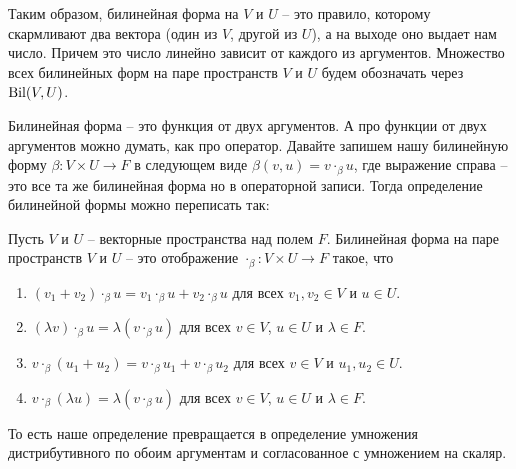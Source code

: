 Таким образом, билинейная форма на $V$ и $U$ -- это правило, которому скармливают два вектора (один из $V$, другой из $U$), а на выходе оно выдает нам число.
Причем это число линейно зависит от каждого из аргументов.
Множество всех билинейных форм на паре пространств $V$ и $U$ будем обозначать через $\operatorname{Bil}(V,U)$.

Билинейная форма -- это функция от двух аргументов.
А про функции от двух аргументов можно думать, как про оператор.
Давайте запишем нашу билинейную форму $\beta\colon V\times U \to F$ в следующем виде $\beta(v,u) = v \cdot_\beta u$, где выражение справа -- это все та же билинейная форма но в операторной записи.
Тогда определение билинейной формы можно переписать так:
\begin{definition}
Пусть $V$ и $U$ -- векторные пространства над полем $F$.
Билинейная форма на паре пространств $V$ и $U$ -- это отображение $\cdot_\beta\colon V\times U \to F$ такое, что
\begin{enumerate}
\item $(v_1 + v_2)\cdot_\beta u = v_1\cdot_\beta u + v_2\cdot_\beta u$ для всех $v_1,v_2\in V$ и $u\in U$.

\item $(\lambda v)\cdot_\beta u = \lambda (v\cdot_\beta u)$ для всех $v\in V$, $u\in U$ и $\lambda\in F$.

\item $v\cdot_\beta( u_1+u_2) = v\cdot_\beta u_1 + v\cdot_\beta u_2$ для всех $v\in V$ и $u_1,u_2\in U$.

\item $v\cdot_\beta(\lambda u) = \lambda (v\cdot_\beta u)$ для всех $v\in V$, $u\in U$ и $\lambda\in F$.
\end{enumerate}
\end{definition}

То есть наше определение превращается в определение умножения дистрибутивного по обоим аргументам и согласованное с умножением на скаляр.



